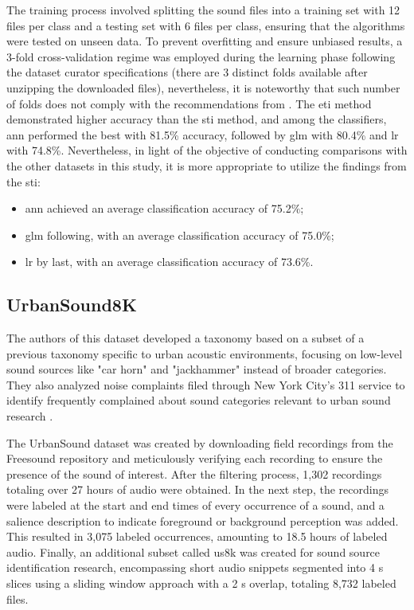 The training process involved splitting the sound files into a training set with 12 files per class and a testing set with 6 files per class, ensuring that the algorithms were tested on unseen data. To prevent overfitting and ensure unbiased results, a 3-fold cross-validation regime was employed during the learning phase following the dataset curator specifications (there are 3 distinct folds available after unzipping the downloaded files), nevertheless, it is noteworthy that such number of folds does not comply with the recommendations from \textcite{James2013}. The \gls{eti} method demonstrated higher accuracy than the \gls{sti} method, and among the classifiers, \gls{ann} performed the best with 81.5\% accuracy, followed by \gls{glm} with 80.4\% and \gls{lr} with 74.8\%. Nevertheless, in light of the objective of conducting comparisons with the other datasets in this study, it is more appropriate to utilize the findings from the \gls{sti}:

\begin{itemize}
    \item \gls{ann} achieved an average classification accuracy of  75.2\%;
    \item \gls{glm} following, with an average classification accuracy of 75.0\%;
    \item \gls{lr} by last, with an average classification accuracy of 73.6\%. 
\end{itemize}


\subsection{UrbanSound8K}
\label{subsec:dataset_US8K}

The authors of this dataset developed a taxonomy based on a subset of a previous taxonomy specific to urban acoustic environments, focusing on low-level sound sources like "car horn" and "jackhammer" instead of broader categories. They also analyzed noise complaints filed through New York City's 311 service to identify frequently complained about sound categories relevant to urban sound research \cite{Salamon2014}.

The UrbanSound dataset was created by downloading field recordings from the Freesound repository \cite{Font_freesound2013} and meticulously verifying each recording to ensure the presence of the sound of interest. After the filtering process, 1,302 recordings totaling over 27 hours of audio were obtained. In the next step, the recordings were labeled at the start and end times of every occurrence of a sound, and a salience description to indicate foreground or background perception was added. This resulted in 3,075 labeled occurrences, amounting to 18.5 hours of labeled audio. Finally, an additional subset called \gls{us8k} was created for sound source identification research, encompassing short audio snippets segmented into 4 \gls{s} slices using a sliding window approach with a 2 \gls{s} overlap, totaling 8,732 labeled files.

